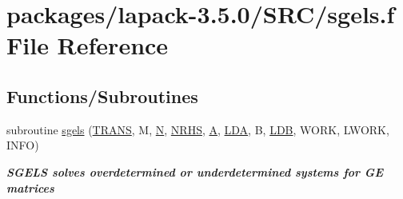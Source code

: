 \hypertarget{sgels_8f}{}\section{packages/lapack-\/3.5.0/\+S\+R\+C/sgels.f File Reference}
\label{sgels_8f}
\subsection*{Functions/\+Subroutines}
\begin{DoxyCompactItemize}
\item 
subroutine \hyperlink{group__realGEsolve_ga166c189c7bcd808a9468c05e53da816f}{sgels} (\hyperlink{superlu__enum__consts_8h_a0c4e17b2d5cea33f9991ccc6a6678d62a1f61e3015bfe0f0c2c3fda4c5a0cdf58}{T\+R\+A\+N\+S}, M, \hyperlink{polmisc_8c_a0240ac851181b84ac374872dc5434ee4}{N}, \hyperlink{example__user_8c_aa0138da002ce2a90360df2f521eb3198}{N\+R\+H\+S}, \hyperlink{classA}{A}, \hyperlink{example__user_8c_ae946da542ce0db94dced19b2ecefd1aa}{L\+D\+A}, B, \hyperlink{example__user_8c_a50e90a7104df172b5a89a06c47fcca04}{L\+D\+B}, W\+O\+R\+K, L\+W\+O\+R\+K, I\+N\+F\+O)
\begin{DoxyCompactList}\small\item\em {\bfseries  S\+G\+E\+L\+S solves overdetermined or underdetermined systems for G\+E matrices} \end{DoxyCompactList}\end{DoxyCompactItemize}
